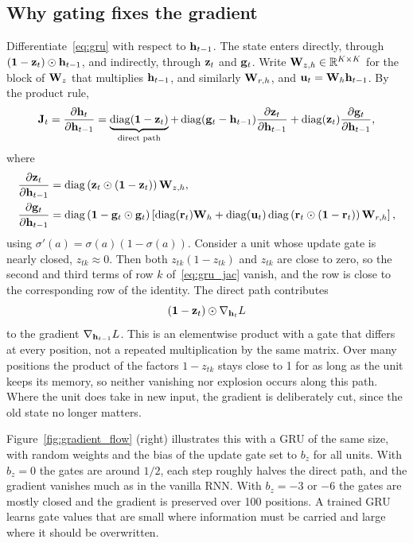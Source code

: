 \subsection{Why gating fixes the gradient}

Differentiate~\eqref{eq:gru} with respect to $\mathbf{h}_{t-1}$. The state enters directly, through $(\mathbf{1}-\mathbf{z}_t)\odot\mathbf{h}_{t-1}$, and indirectly, through $\mathbf{z}_t$ and $\mathbf{g}_t$. Write $\mathbf{W}_{z,h}\in\mathbb{R}^{K\times K}$ for the block of $\mathbf{W}_z$ that multiplies $\mathbf{h}_{t-1}$, and similarly $\mathbf{W}_{r,h}$, and $\mathbf{u}_t=\mathbf{W}_h\mathbf{h}_{t-1}$. By the product rule,
\begin{equation}
  \mathbf{J}_t = \frac{\partial\mathbf{h}_t}{\partial\mathbf{h}_{t-1}}
  = \underbrace{\operatorname{diag}(\mathbf{1}-\mathbf{z}_t)}_{\text{direct path}}
  + \operatorname{diag}(\mathbf{g}_t-\mathbf{h}_{t-1})\frac{\partial\mathbf{z}_t}{\partial\mathbf{h}_{t-1}}
  + \operatorname{diag}(\mathbf{z}_t)\frac{\partial\mathbf{g}_t}{\partial\mathbf{h}_{t-1}},
  \label{eq:gru_jac}
\end{equation}
where
\begin{align}
  \frac{\partial\mathbf{z}_t}{\partial\mathbf{h}_{t-1}} &= \operatorname{diag}\left(\mathbf{z}_t\odot(\mathbf{1}-\mathbf{z}_t)\right)\mathbf{W}_{z,h},\\
  \frac{\partial\mathbf{g}_t}{\partial\mathbf{h}_{t-1}} &= \operatorname{diag}\left(\mathbf{1}-\mathbf{g}_t\odot\mathbf{g}_t\right)\left[\operatorname{diag}(\mathbf{r}_t)\mathbf{W}_h + \operatorname{diag}(\mathbf{u}_t)\operatorname{diag}\left(\mathbf{r}_t\odot(\mathbf{1}-\mathbf{r}_t)\right)\mathbf{W}_{r,h}\right],
\end{align}
using $\sigma'(a)=\sigma(a)(1-\sigma(a))$. Consider a unit whose update gate is nearly closed, $z_{tk}\approx0$. Then both $z_{tk}(1-z_{tk})$ and $z_{tk}$ are close to zero, so the second and third terms of row $k$ of~\eqref{eq:gru_jac} vanish, and the row is close to the corresponding row of the identity. The direct path contributes
\begin{equation}
  (\mathbf{1}-\mathbf{z}_t)\odot\nabla_{\mathbf{h}_t}L
\end{equation}
to the gradient $\nabla_{\mathbf{h}_{t-1}}L$. This is an elementwise product with a gate that differs at every position, not a repeated multiplication by the same matrix. Over many positions the product of the factors $1-z_{tk}$ stays close to 1 for as long as the unit keeps its memory, so neither vanishing nor explosion occurs along this path. Where the unit does take in new input, the gradient is deliberately cut, since the old state no longer matters.

Figure~\ref{fig:gradient_flow} (right) illustrates this with a GRU of the same size, with random weights and the bias of the update gate set to $b_z$ for all units. With $b_z=0$ the gates are around $1/2$, each step roughly halves the direct path, and the gradient vanishes much as in the vanilla RNN. With $b_z=-3$ or $-6$ the gates are mostly closed and the gradient is preserved over 100 positions. A trained GRU learns gate values that are small where information must be carried and large where it should be overwritten.

